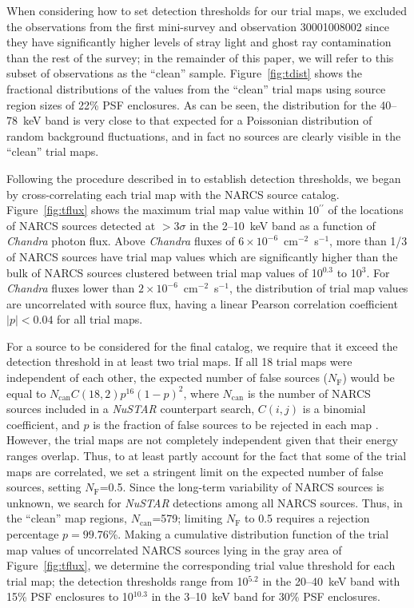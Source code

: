 \documentclass[iop,revtex4]{emulateapj}
\begin{document}
When considering how to set detection thresholds for our trial maps, we excluded the observations from the first mini-survey and observation 30001008002 since they have significantly higher levels of stray light and ghost ray contamination than the rest of the survey; in the remainder of this paper, we will refer to this subset of observations as the ``clean'' sample.  Figure~\ref{fig:tdist} shows the fractional distributions of the values from the ``clean'' trial maps using source region sizes of 22\% PSF enclosures.  As can be seen, the distribution for the 40--78~keV band is very close to that expected for a Poissonian distribution of random background fluctuations, and in fact no sources are clearly visible in the ``clean'' trial maps.  \par
Following the procedure described in \citet{hong16} to establish detection thresholds, we began by cross-correlating each trial map with the NARCS source catalog.  Figure~\ref{fig:tflux} shows the maximum trial map value within 10$^{\prime\prime}$ of the locations of NARCS sources detected at $>3\sigma$ in the 2--10~keV band as a function of \textit{Chandra} photon flux.  Above \textit{Chandra} fluxes of $6\times10^{-6}$~cm$^{-2}$~s$^{-1}$, more than 1/3 of NARCS sources have trial map values which are significantly higher than the bulk of NARCS sources clustered between trial map values of 10$^{0.3}$ to 10$^{3}$.  For \textit{Chandra} fluxes lower than $2\times10^{-6}$~cm$^{-2}$~s$^{-1}$, the distribution of trial map values are uncorrelated with source flux, having a linear Pearson correlation coefficient $|p|<0.04$ for all trial maps.  \par  
For a source to be considered for the final catalog, we require that it exceed the detection threshold in at least two trial maps.  If all 18 trial maps were independent of each other, the expected number of false sources ($N_{\mathrm{F}}$) would be equal to $N_{\mathrm{can}}C(18,2)p^{16}(1-p)^2$, where $N_{\mathrm{can}}$ is the number of NARCS sources included in a \textit{NuSTAR} counterpart search, $C(i,j)$ is a binomial coefficient, and $p$ is the fraction of false sources to be rejected in each map \citep{hong16}.  However, the trial maps are not completely independent given that their energy ranges overlap.  Thus, to at least partly account for the fact that some of the trial maps are correlated, we set a stringent limit on the expected number of false sources, setting $N_{\mathrm{F}}$=0.5.  Since the long-term variability of NARCS sources is unknown, we search for \textit{NuSTAR} detections among all NARCS sources.  Thus, in the ``clean'' map regions, $N_{\mathrm{can}}$=579; limiting $N_{\mathrm{F}}$ to 0.5 requires a rejection percentage $p = 99.76$\%.  Making a cumulative distribution function of the trial map values of uncorrelated NARCS sources lying in the gray area of Figure~\ref{fig:tflux}, we determine the corresponding trial value threshold for each trial map; the detection thresholds range from 10$^{5.2}$ in the 20--40~keV band with 15\% PSF enclosures to 10$^{10.3}$ in the 3--10~keV band for 30\% PSF enclosures.  \par
\end{document}
